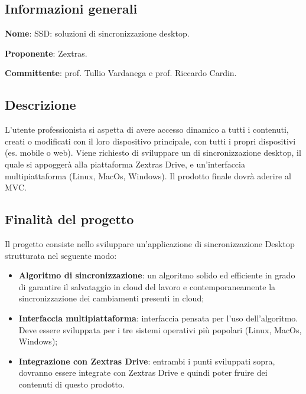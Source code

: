 \documentclass[../studio-di-fattibilita.tex]{subfiles}
\begin{document}
\subsection{Informazioni generali}%
\label{sub:c7_informazioni_generale}
\begin{description}
  \item \textbf{Nome}: SSD: soluzioni di sincronizzazione desktop.
  \item \textbf{Proponente}: Zextras.
  \item \textbf{Committente}: prof. Tullio Vardanega e prof. Riccardo Cardin.
\end{description}

\subsection{Descrizione}%
\label{sub:c7_descrizione}
L’utente professionista si aspetta di avere accesso dinamico a tutti i contenuti, creati o modificati con il loro dispositivo principale, con tutti i propri dispositivi (es. mobile o web).
Viene richiesto di sviluppare un  di sincronizzazione desktop, il quale si appoggerà alla piattaforma Zextras Drive, e un’interfaccia multipiattaforma (Linux, MacOs, Windows).
Il prodotto finale dovrà aderire al  MVC.

\subsection{Finalità del progetto}%
\label{sub:c7_finalita_del_progetto}
Il progetto consiste nello sviluppare un’applicazione di sincronizzazione Desktop strutturata nel seguente modo:
\begin{itemize}
  \item \textbf{Algoritmo di sincronizzazione}: un algoritmo solido ed efficiente in grado di garantire il salvataggio in cloud del lavoro e contemporaneamente la sincronizzazione dei cambiamenti presenti in cloud;
  \item \textbf{Interfaccia multipiattaforma}: interfaccia pensata per l’uso dell’algoritmo. Deve essere sviluppata per i tre sistemi operativi più popolari (Linux, MacOs, Windows);
  \item \textbf{Integrazione con Zextras Drive}: entrambi i punti sviluppati sopra, dovranno essere integrate con Zextras Drive e quindi poter fruire dei contenuti di questo prodotto.
\end{itemize}
\end{document}
